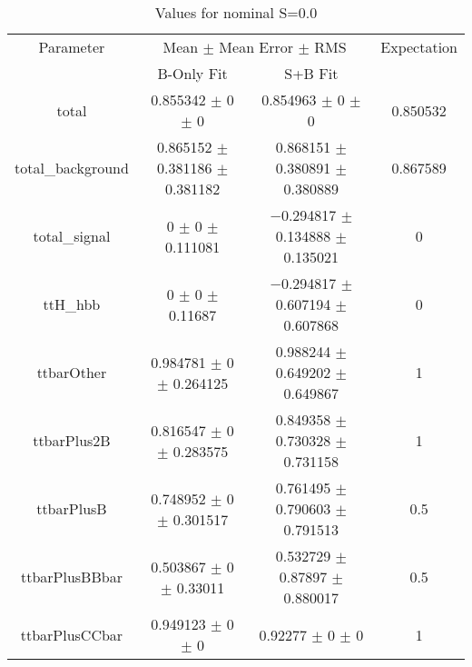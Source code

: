 \begin{table}
\centering
\caption{Values for nominal S=0.0}
\begin{tabular}{cccc}
\toprule
Parameter & \multicolumn{2}{c}{Mean $\pm$ Mean Error $\pm$ RMS} & Expectation\\
 & B-Only Fit & S+B Fit & \\
\midrule
total & \num{0.855342} $\pm$ \num{0} $\pm$ \num{0} & \num{0.854963} $\pm$ \num{0} $\pm$ \num{0} & \num{0.850532}\\
total\_background & \num{0.865152} $\pm$ \num{0.381186} $\pm$ \num{0.381182} & \num{0.868151} $\pm$ \num{0.380891} $\pm$ \num{0.380889} & \num{0.867589}\\
total\_signal & \num{0} $\pm$ \num{0} $\pm$ \num{0.111081} & \num{-0.294817} $\pm$ \num{0.134888} $\pm$ \num{0.135021} & \num{0}\\
ttH\_hbb & \num{0} $\pm$ \num{0} $\pm$ \num{0.11687} & \num{-0.294817} $\pm$ \num{0.607194} $\pm$ \num{0.607868} & \num{0}\\
ttbarOther & \num{0.984781} $\pm$ \num{0} $\pm$ \num{0.264125} & \num{0.988244} $\pm$ \num{0.649202} $\pm$ \num{0.649867} & \num{1}\\
ttbarPlus2B & \num{0.816547} $\pm$ \num{0} $\pm$ \num{0.283575} & \num{0.849358} $\pm$ \num{0.730328} $\pm$ \num{0.731158} & \num{1}\\
ttbarPlusB & \num{0.748952} $\pm$ \num{0} $\pm$ \num{0.301517} & \num{0.761495} $\pm$ \num{0.790603} $\pm$ \num{0.791513} & \num{0.5}\\
ttbarPlusBBbar & \num{0.503867} $\pm$ \num{0} $\pm$ \num{0.33011} & \num{0.532729} $\pm$ \num{0.87897} $\pm$ \num{0.880017} & \num{0.5}\\
ttbarPlusCCbar & \num{0.949123} $\pm$ \num{0} $\pm$ \num{0} & \num{0.92277} $\pm$ \num{0} $\pm$ \num{0} & \num{1}\\
\bottomrule
\end{tabular}
\end{table}